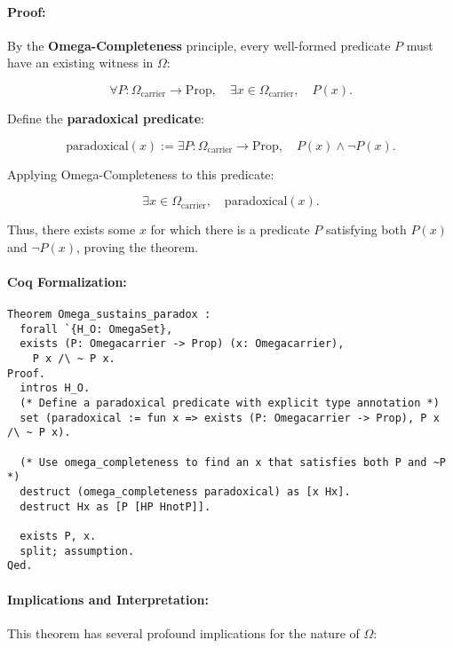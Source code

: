\documentclass[12pt]{article}
\begin{document}
\paragraph{Proof:}
By the \textbf{Omega-Completeness} principle, every well-formed predicate \( P \) must have an existing witness in \( \Omega \):

\begin{equation}
    \forall P: \Omega_{\text{carrier}} \to \text{Prop}, \quad
    \exists x \in \Omega_{\text{carrier}}, \quad P(x).
\end{equation}

Define the \textbf{paradoxical predicate}:

\begin{equation}
    \text{paradoxical}(x) := \exists P: \Omega_{\text{carrier}} \to \text{Prop}, \quad P(x) \wedge \neg P(x).
\end{equation}

Applying Omega-Completeness to this predicate:

\begin{equation}
    \exists x \in \Omega_{\text{carrier}}, \quad \text{paradoxical}(x).
\end{equation}

Thus, there exists some \( x \) for which there is a predicate \( P \) satisfying both \( P(x) \) and \( \neg P(x) \), proving the theorem.

\paragraph{Coq Formalization:}
\begin{lstlisting}[language=Coq]
Theorem Omega_sustains_paradox :
  forall `{H_O: OmegaSet},
  exists (P: Omegacarrier -> Prop) (x: Omegacarrier),
    P x /\ ~ P x.
Proof.
  intros H_O.
  (* Define a paradoxical predicate with explicit type annotation *)
  set (paradoxical := fun x => exists (P: Omegacarrier -> Prop), P x /\ ~ P x).
  
  (* Use omega_completeness to find an x that satisfies both P and ~P *)
  destruct (omega_completeness paradoxical) as [x Hx].
  destruct Hx as [P [HP HnotP]].
  
  exists P, x.
  split; assumption.
Qed.
\end{lstlisting}

\paragraph{Implications and Interpretation:}
This theorem has several profound implications for the nature of \( \Omega \):
\end{document}
